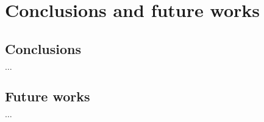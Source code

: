 \chapter{Conclusions and future works}
\label{ConclusionOnDissertation}
\section{Conclusions}
$\ldots$
\section{Future works}
$\ldots$